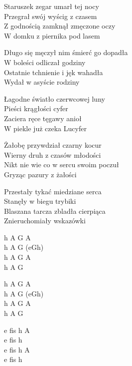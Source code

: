 \begin{textn}
    Staruszek zegar umarł tej nocy\\
    Przegrał swój wyścig z czasem\\
    Z godnością zamknął zmęczone oczy\\
    W domku z piernika pod lasem

    Długo się męczył nim śmierć go dopadła\\
    W boleści odliczał godziny\\
    Ostatnie tchnienie i jęk wahadła\\
    Wydał w asyście rodziny

    \vin Łagodne światło czerwcowej luny\\
    \vin Pieści krągłości cyfer\\
    \vin Zaciera ręce tęgawy anioł\\
    \vin W piekle już czeka Lucyfer

    Żałobę przywdział czarny kocur\\
    Wierny druh z czasów młodości\\
    Nikt nie wie co w sercu swoim poczuł\\
    Gryząc pazury z żałości

    Przestały tykać miedziane serca\\
    Stanęły w biegu trybiki\\
    Blaszana tarcza zbladła cierpiąca\\
    Znieruchomiały wskazówki
\end{textn}
\begin{chordw}
    h A G A\\
    h A G (eGh)\\
    h A G A\\
    h A G

    h A G A\\
    h A G (eGh)\\
    h A G A\\
    h A G

    e fis h A\\
    e fis h\\
    e fis h A\\
    e fis h
\end{chordw}